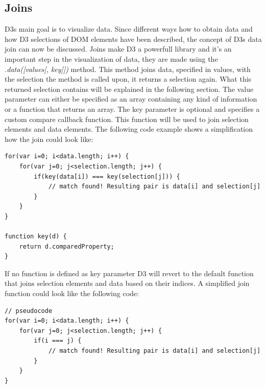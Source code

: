 \documentclass{bioinfo}
\begin{document}
\subsection{Joins} \label{s:joins}
D3s main goal is to visualize data. Since different ways how to obtain data and how D3 selections of DOM elements have been described, the concept of D3s data join can now be discussed. Joins make D3 a powerfull library and it's an important step in the visualization of data, they are made using the \textit{.data([values[, key]])} method.
This method joins data, specified in values, with the selection the method is called upon, it returns a selection again. What this returned selection contains will be explained in the following section.
\newline
The value parameter can either be specified as an array containing any kind of information or a function that returns an array.
The key parameter is optional and specifies a custom compare callback function.
This function will be used to join selection elements and data elements.
The following code example shows a simplification how the join could look like:
\begin{lstlisting}
for(var i=0; i<data.length; i++) {
	for(var j=0; j<selection.length; j++) {
		if(key(data[i]) === key(selection[j])) {
			// match found! Resulting pair is data[i] and selection[j]
		}
	}
}

function key(d) {
	return d.comparedProperty;
}
\end{lstlisting}
If no function is defined as key parameter D3 will revert to the default function that joins selection elements and data based on their indices.
A simplified join function could look like the following code:
\begin{lstlisting}
// pseudocode
for(var i=0; i<data.length; i++) {
	for(var j=0; j<selection.length; j++) {
		if(i === j) {
			// match found! Resulting pair is data[i] and selection[j]
		}
	}
}
\end{lstlisting}
\end{document}
